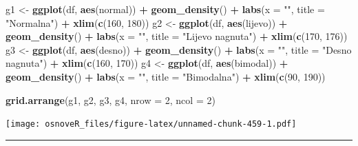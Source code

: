 \documentclass[]{book}
\newenvironment{Shaded}{\begin{snugshade}}{\end{snugshade}}
\newcommand{\KeywordTok}[1]{\textcolor[rgb]{0.13,0.29,0.53}{\textbf{#1}}}
\newcommand{\DataTypeTok}[1]{\textcolor[rgb]{0.13,0.29,0.53}{#1}}
\newcommand{\DecValTok}[1]{\textcolor[rgb]{0.00,0.00,0.81}{#1}}
\newcommand{\StringTok}[1]{\textcolor[rgb]{0.31,0.60,0.02}{#1}}
\newcommand{\OperatorTok}[1]{\textcolor[rgb]{0.81,0.36,0.00}{\textbf{#1}}}
\newcommand{\NormalTok}[1]{#1}
\theoremstyle{definition}
\theoremstyle{definition}
\theoremstyle{definition}
\theoremstyle{remark}
\begin{document}
\begin{Shaded}
\begin{Highlighting}[]
\NormalTok{g1 <-}\StringTok{ }\KeywordTok{ggplot}\NormalTok{(df, }\KeywordTok{aes}\NormalTok{(normal)) }\OperatorTok{+}\StringTok{ }\KeywordTok{geom_density}\NormalTok{() }\OperatorTok{+}\StringTok{ }\KeywordTok{labs}\NormalTok{(}\DataTypeTok{x =} \StringTok{""}\NormalTok{, }\DataTypeTok{title =} \StringTok{"Normalna"}\NormalTok{) }\OperatorTok{+}\StringTok{ }\KeywordTok{xlim}\NormalTok{(}\KeywordTok{c}\NormalTok{(}\DecValTok{160}\NormalTok{, }\DecValTok{180}\NormalTok{))}
\NormalTok{g2 <-}\StringTok{ }\KeywordTok{ggplot}\NormalTok{(df, }\KeywordTok{aes}\NormalTok{(lijevo)) }\OperatorTok{+}\StringTok{ }\KeywordTok{geom_density}\NormalTok{() }\OperatorTok{+}\StringTok{ }\KeywordTok{labs}\NormalTok{(}\DataTypeTok{x =} \StringTok{""}\NormalTok{, }\DataTypeTok{title =} \StringTok{"Lijevo nagnuta"}\NormalTok{) }\OperatorTok{+}\StringTok{ }\KeywordTok{xlim}\NormalTok{(}\KeywordTok{c}\NormalTok{(}\DecValTok{170}\NormalTok{, }\DecValTok{176}\NormalTok{))}
\NormalTok{g3 <-}\StringTok{ }\KeywordTok{ggplot}\NormalTok{(df, }\KeywordTok{aes}\NormalTok{(desno)) }\OperatorTok{+}\StringTok{ }\KeywordTok{geom_density}\NormalTok{() }\OperatorTok{+}\StringTok{ }\KeywordTok{labs}\NormalTok{(}\DataTypeTok{x =} \StringTok{""}\NormalTok{, }\DataTypeTok{title =} \StringTok{"Desno nagnuta"}\NormalTok{) }\OperatorTok{+}\StringTok{ }\KeywordTok{xlim}\NormalTok{(}\KeywordTok{c}\NormalTok{(}\DecValTok{160}\NormalTok{, }\DecValTok{170}\NormalTok{))}
\NormalTok{g4 <-}\StringTok{ }\KeywordTok{ggplot}\NormalTok{(df, }\KeywordTok{aes}\NormalTok{(bimodal)) }\OperatorTok{+}\StringTok{ }\KeywordTok{geom_density}\NormalTok{() }\OperatorTok{+}\StringTok{ }\KeywordTok{labs}\NormalTok{(}\DataTypeTok{x =} \StringTok{""}\NormalTok{, }\DataTypeTok{title =} \StringTok{"Bimodalna"}\NormalTok{) }\OperatorTok{+}\StringTok{ }\KeywordTok{xlim}\NormalTok{(}\KeywordTok{c}\NormalTok{(}\DecValTok{90}\NormalTok{, }\DecValTok{190}\NormalTok{))}

\KeywordTok{grid.arrange}\NormalTok{(g1, g2, g3, g4, }\DataTypeTok{nrow =} \DecValTok{2}\NormalTok{, }\DataTypeTok{ncol =} \DecValTok{2}\NormalTok{)}
\end{Highlighting}
\end{Shaded}

\texttt{[image: osnoveR\_files/figure-latex/unnamed-chunk-459-1.pdf]}

\begin{center}\rule{0.5\linewidth}{\linethickness}\end{center}
\end{document}

